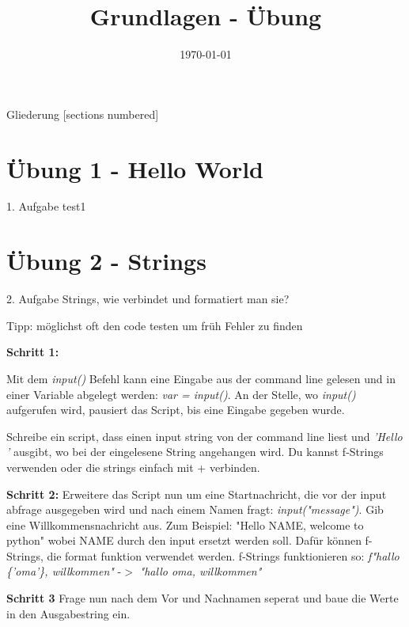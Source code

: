 



\title{Grundlagen - Übung}
\date{\today}


\maketitle

\begin{frame}{Gliederung}
	[sections numbered]
	\tableofcontents
\end{frame}


\section{Übung 1 - Hello World}

\begin{frame}{1. Aufgabe}
	test1
\end{frame}

\section{Übung 2 - Strings}

\begin{frame}{2. Aufgabe}
	Strings, wie verbindet und formatiert man sie?
	
	Tipp: möglichst oft den code testen um früh Fehler zu finden
	
	\textbf{Schritt 1:}
	
	Mit dem \textit{input()} Befehl kann eine Eingabe aus der command line gelesen und in einer Variable abgelegt werden: \textit{var = input()}. An der Stelle, wo \textit{input()} aufgerufen wird, pausiert das Script, bis eine Eingabe gegeben wurde.
	
	Schreibe ein script, dass einen input string von der command line liest und \textit{'Hello '} ausgibt, wo bei der eingelesene String angehangen wird. Du kannst f-Strings verwenden oder die strings einfach mit + verbinden.
\end{frame}
\begin{frame}
	\textbf{Schritt 2:}
	Erweitere das Script nun um eine Startnachricht, die vor der input abfrage ausgegeben wird und nach einem Namen fragt: \textit{input("message")}. Gib eine Willkommensnachricht aus. Zum Beispiel: "Hello NAME, welcome to python" wobei NAME durch den input ersetzt werden soll. Dafür können f-Strings, die format funktion verwendet werden.
	\linebreak
	f-Strings funktionieren so: \textit{f"hallo \{'oma'\}, willkommen"} -$>$ \textit{"hallo oma, willkommen"}
	\linebreak
	
	\textbf{Schritt 3}	
	Frage nun nach dem Vor und Nachnamen seperat und baue die Werte in den Ausgabestring ein.
\end{frame}


